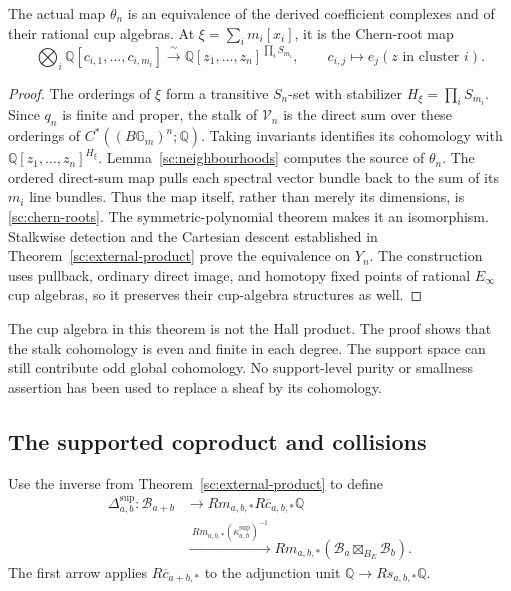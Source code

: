 \begin{theorem}\label{sc:ordered-equivalence}
The actual map $\theta_n$ is an equivalence of the derived
coefficient complexes and of their rational cup algebras.
At $\xi=\sum_i m_i[x_i]$, it is the Chern-root map
\begin{equation}\label{sc:chern-roots}
 \bigotimes_i\mathbb Q[c_{i,1},\ldots,c_{i,m_i}]
 \xrightarrow{\ \sim\ }
 \mathbb Q[z_1,\ldots,z_n]^{\prod_iS_{m_i}},
 \qquad c_{i,j}\longmapsto e_j(z\text{ in cluster }i).
\end{equation}
\end{theorem}
\begin{proof}
The orderings of $\xi$ form a transitive $S_n$-set with stabilizer
$H_\xi=\prod_iS_{m_i}$. Since $q_n$ is finite and proper, the
stalk of $\mathcal V_n$ is the direct sum over these orderings
of $C^*((B\mathbb G_m)^n;\mathbb Q)$.
Taking invariants identifies its cohomology with
$\mathbb Q[z_1,\ldots,z_n]^{H_\xi}$.
Lemma~\ref{sc:neighbourhoods} computes the source of $\theta_n$.
The ordered direct-sum map pulls each spectral vector bundle back
to the sum of its $m_i$ line bundles. Thus the map itself, rather
than merely its dimensions, is \eqref{sc:chern-roots}.
The symmetric-polynomial theorem makes it an isomorphism.
Stalkwise detection and the Cartesian descent established in
Theorem~\ref{sc:external-product} prove the equivalence on $Y_n$.
The construction uses pullback, ordinary direct image, and homotopy
fixed points of rational $E_\infty$ cup algebras, so it preserves
their cup-algebra structures as well.
\end{proof}

The cup algebra in this theorem is not the Hall product.
The proof shows that the stalk cohomology is even and finite in
each degree. The support space can still contribute odd global
cohomology. No support-level purity or smallness assertion has
been used to replace a sheaf by its cohomology.

\subsection{The supported coproduct and collisions}

Use the inverse from Theorem~\ref{sc:external-product} to define
\begin{equation}\label{sc:coproduct}
 \begin{split}
 \Delta^{\mathrm{sup}}_{a,b}:\mathcal B_{a+b}
 &\longrightarrow Rm_{a,b,*}R\overline c_{a,b,*}\mathbb Q\\
 &\xrightarrow{\ Rm_{a,b,*}(\kappa^{\mathrm{sup}}_{a,b})^{-1}\ }
       Rm_{a,b,*}(\mathcal B_a\boxtimes_{B_E}\mathcal B_b).
 \end{split}
\end{equation}
The first arrow applies $R\overline c_{a+b,*}$ to the adjunction
unit $\mathbb Q\to Rs_{a,b,*}\mathbb Q$.

